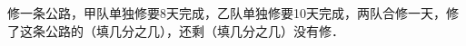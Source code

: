 
修一条公路，甲队单独修要8天完成，乙队单独修要10天完成，两队合修一天，修了这条公路的\key{\hspace{4em}}（填几分之几），还剩\key{\hspace{4em}}（填几分之几）没有修．\\

